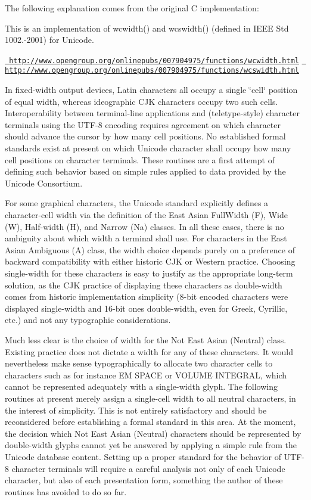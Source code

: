 The following explanation comes from the original C implementation\+:

This is an implementation of wcwidth() and wcswidth() (defined in IEEE Std 1002.-\/2001) for Unicode.

\href{http://www.opengroup.org/onlinepubs/007904975/functions/wcwidth.html}{\texttt{ http\+://www.\+opengroup.\+org/onlinepubs/007904975/functions/wcwidth.\+html}} \href{http://www.opengroup.org/onlinepubs/007904975/functions/wcswidth.html}{\texttt{ http\+://www.\+opengroup.\+org/onlinepubs/007904975/functions/wcswidth.\+html}}

In fixed-\/width output devices, Latin characters all occupy a single \char`\"{}cell\char`\"{} position of equal width, whereas ideographic CJK characters occupy two such cells. Interoperability between terminal-\/line applications and (teletype-\/style) character terminals using the UTF-\/8 encoding requires agreement on which character should advance the cursor by how many cell positions. No established formal standards exist at present on which Unicode character shall occupy how many cell positions on character terminals. These routines are a first attempt of defining such behavior based on simple rules applied to data provided by the Unicode Consortium.

For some graphical characters, the Unicode standard explicitly defines a character-\/cell width via the definition of the East Asian Full\+Width (F), Wide (W), Half-\/width (H), and Narrow (Na) classes. In all these cases, there is no ambiguity about which width a terminal shall use. For characters in the East Asian Ambiguous (A) class, the width choice depends purely on a preference of backward compatibility with either historic CJK or Western practice. Choosing single-\/width for these characters is easy to justify as the appropriate long-\/term solution, as the CJK practice of displaying these characters as double-\/width comes from historic implementation simplicity (8-\/bit encoded characters were displayed single-\/width and 16-\/bit ones double-\/width, even for Greek, Cyrillic, etc.) and not any typographic considerations.

Much less clear is the choice of width for the Not East Asian (Neutral) class. Existing practice does not dictate a width for any of these characters. It would nevertheless make sense typographically to allocate two character cells to characters such as for instance EM SPACE or VOLUME INTEGRAL, which cannot be represented adequately with a single-\/width glyph. The following routines at present merely assign a single-\/cell width to all neutral characters, in the interest of simplicity. This is not entirely satisfactory and should be reconsidered before establishing a formal standard in this area. At the moment, the decision which Not East Asian (Neutral) characters should be represented by double-\/width glyphs cannot yet be answered by applying a simple rule from the Unicode database content. Setting up a proper standard for the behavior of UTF-\/8 character terminals will require a careful analysis not only of each Unicode character, but also of each presentation form, something the author of these routines has avoided to do so far.

